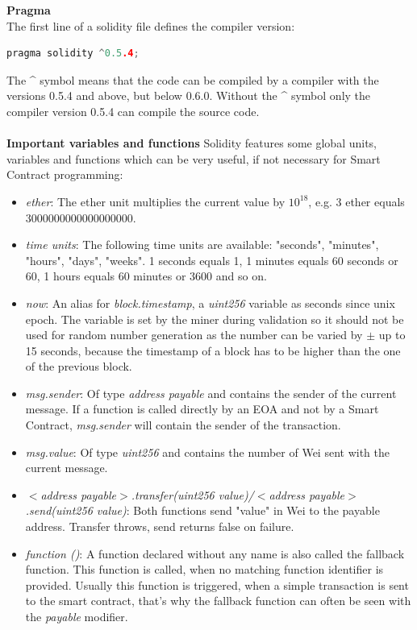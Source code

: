 \leavevmode
\newpage
\textbf{Pragma}\\
The first line of a solidity file defines the compiler version\cite{doc-pragma}:
\begin{lstlisting}[language=C++]
  pragma solidity ^0.5.4;
\end{lstlisting}
The \^{} symbol means that the code can be compiled by a compiler with the versions 0.5.4 and above, but below 0.6.0. Without the \^{} symbol only the compiler version 0.5.4 can compile the source code.
\\\\
\textbf{Important variables and functions}
Solidity features some global units, variables and functions which can be very useful, if not necessary for Smart Contract programming:
\begin{itemize}
  \item \textit{ether}: The ether unit multiplies the current value by \(10^{18}\), e.g. 3 ether equals 3000000000000000000.
  \item \textit{time units}: The following time units are available: "seconds", "minutes", "hours", "days", "weeks". 1 seconds equals 1, 1 minutes equals 60 seconds or 60, 1 hours equals 60 minutes or 3600 and so on.
  \item \textit{now}: An alias for \textit{block.timestamp}, a \textit{uint256} variable as seconds since unix epoch. The variable is set by the miner during validation so it should not be used for random number generation as the number can be varied by $\pm$ up to 15 seconds, because the timestamp of a block has to be higher than the one of the previous block.
  \item \textit{msg.sender}: Of type \textit{address payable} and contains the sender of the current message. If a function is called directly by an EOA and not by a Smart Contract, \textit{msg.sender} will contain the sender of the transaction.
  \item \textit{msg.value}: Of type \textit{uint256} and contains the number of Wei sent with the current message.
  \item \textit{$<$address payable$>$.transfer(uint256 value)/$<$address payable$>$.send(uint256 value)}: Both functions send "value" in Wei to the payable address. Transfer throws, send returns false on failure.
  \item \textit{function ()}: A function declared without any name is also called the fallback function. This function is called, when no matching function identifier is provided. Usually this function is triggered, when a simple transaction is sent to the smart contract, that’s why the fallback function can often be seen with the \textit{payable} modifier.

\end{itemize}
